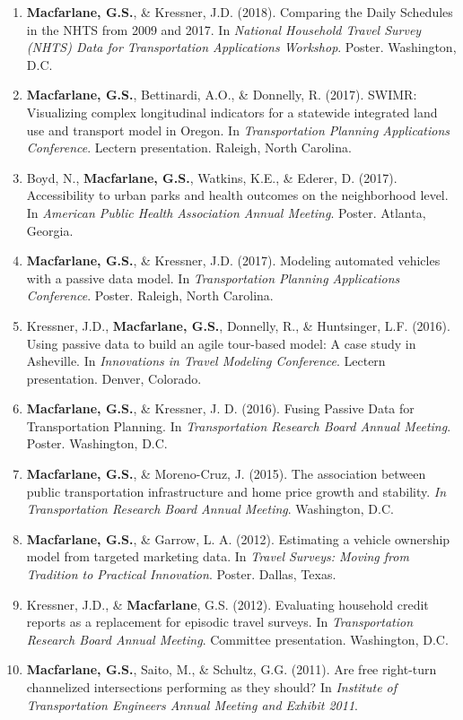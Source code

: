 \documentclass[margin,line]{res}
\newif\ifdetail{}
\newcounter{enuminitialize}
\newenvironment{myenum}[1][]
{%
 \setcounter{enuminitialize}{#1}
 \addtocounter{enuminitialize}{2}
 \begin{enumerate}[left= 4pt, itemsep=8pt, start=\value{enuminitialize}, label=\arabic*\addtocounter{enumi}{-2}]
}
{%
 \end{enumerate}
}
\begin{document}
\begin{resume}
\begin{myenum}[45]
\item \textbf{Macfarlane, G.S.}, \& Kressner, J.D. (2018). Comparing the Daily Schedules in the NHTS from 2009 and 2017. In \textit{National Household Travel Survey (NHTS) Data for Transportation Applications Workshop}. Poster. Washington, D.C.
\item \textbf{Macfarlane, G.S.}, Bettinardi, A.O., \& Donnelly, R. (2017). SWIMR: Visualizing complex longitudinal indicators for a statewide integrated land use and transport model in Oregon. In \textit{Transportation Planning Applications Conference}. Lectern presentation. Raleigh, North Carolina.
\item Boyd, N., \textbf{Macfarlane, G.S.}, Watkins, K.E., \& Ederer, D. (2017). Accessibility to urban parks and health outcomes on the neighborhood level. In \textit{ American Public Health Association Annual Meeting}. Poster. Atlanta, Georgia.
\item \textbf{Macfarlane, G.S.}, \& Kressner, J.D. (2017). Modeling automated vehicles with a passive data model. In \textit{Transportation Planning Applications Conference}. Poster. Raleigh, North Carolina.
\item Kressner, J.D., \textbf{Macfarlane, G.S.}, Donnelly, R., \& Huntsinger, L.F. (2016). Using passive data to build an agile tour-based model: A case study in Asheville. In \textit{Innovations in Travel Modeling Conference}. Lectern presentation. Denver, Colorado. \ifdetail Citations: 7  \fi
\item \textbf{Macfarlane, G.S.}, \& Kressner, J. D. (2016). Fusing Passive Data for Transportation Planning. In \textit{Transportation Research Board Annual Meeting}. Poster. Washington, D.C.
\item \textbf{Macfarlane, G.S.}, \& Moreno-Cruz, J. (2015). The association between public transportation infrastructure and home price growth and stability. \textit{In Transportation Research Board Annual Meeting}. Washington, D.C.
\item \textbf{Macfarlane, G.S.}, \& Garrow, L. A. (2012). Estimating a vehicle ownership model from targeted marketing data. In \textit{Travel Surveys: Moving from Tradition to Practical Innovation}. Poster. Dallas, Texas.
\item Kressner, J.D., \& \textbf{Macfarlane}, G.S. (2012). Evaluating household credit reports as a replacement for episodic travel surveys. In \textit{Transportation Research Board Annual Meeting}. Committee presentation. Washington, D.C.
\item \textbf{Macfarlane, G.S.}, Saito, M., \& Schultz, G.G. (2011). Are free right-turn channelized intersections performing as they should? In \textit{Institute of Transportation Engineers Annual Meeting and Exhibit 2011}.
\end{myenum}




\end{resume}
\end{document}
